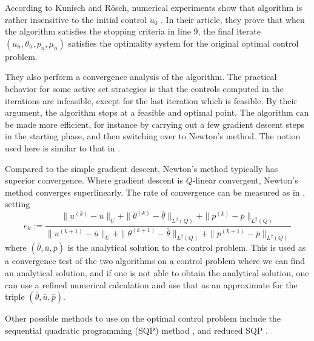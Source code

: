 According to Kunisch and Rösch, numerical experiments show that algorithm is rather insensitive to the initial control $u_0$ \cite{primal_dual}. In their article, they prove that when the algorithm satisfies the stopping criteria in line 9, the final iterate $(u_n, \theta_n, p_n, \mu_n)$ satisfies the optimality system for the original optimal control problem.

They also perform a convergence analysis of the algorithm. The practical behavior for some active set strategies is that the controls computed in the iterations are infeasible, except for the last iteration which is feasible. By their argument, the algorithm stops at a feasible and optimal point. The algorithm can be made more efficient, for instance by carrying out a few gradient descent steps in the starting phase, and then switching over to Newton's method. The notion used here is similar to that in \cite{Algorithms}.

Compared to the simple gradient descent, Newton's method typically has superior convergence. Where gradient descent is $Q$-linear convergent, Newton's method converges superlinearly.
The rate of convergence can be measured as in \cite{DPSteel}, setting 
\begin{equation}
    \label{eq:rate_of_conv}
    e_k := \frac{\|u^{(k)}-\bar{u}\|_U + \|\theta^{(k)}-\bar{\theta}\|_{L^2(Q)} +\|p^{(k)}-\bar{p}\|_{L^2(Q)} }{\|u^{(k+1)}-\bar{u}\|_U + \|\theta^{(k+1)}-\bar{\theta}\|_{L^2(Q)} +\|p^{(k+1)}-\bar{p}\|_{L^2(Q)}}
\end{equation}
where $(\bar{\theta},\bar{u},\bar{p})$ is the analytical solution to the control problem. This is used as a convergence test of the two algorithms on a control problem where we can find an analytical solution, and if one is not able to obtain the analytical solution, one can use a refined numerical calculation and use that as an approximate for the triple $(\bar{\theta},\bar{u},\bar{p})$. 

Other possible methods to use on the optimal control problem include the sequential quadratic programming (SQP) method \cite{Algorithms}, and reduced SQP \cite{DPSteel}. 
